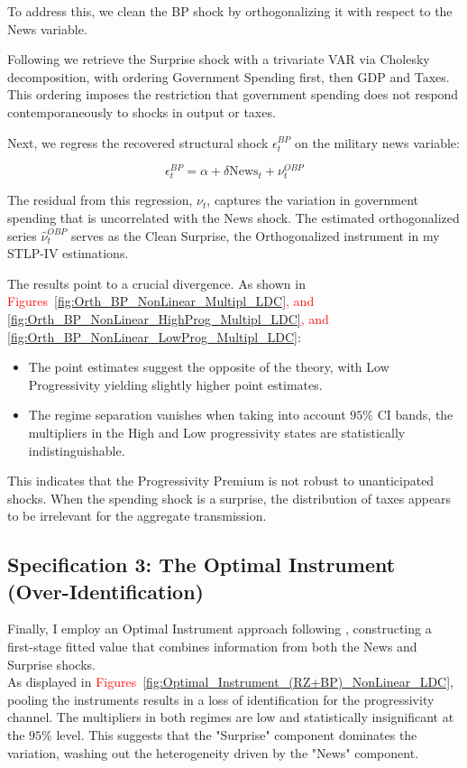\documentclass[12pt,letterpaper]{article}
\begin{document}
To address this, we clean the BP shock by orthogonalizing it with respect to the \cite{RameyZubairy2018} News variable. 

Following \cite{BP} we retrieve the Surprise shock with a trivariate VAR via Cholesky decomposition, with ordering Government Spending first, then GDP and Taxes. This ordering imposes the restriction that government spending does not respond contemporaneously to shocks in output or taxes.

Next, we regress the recovered structural shock $\epsilon^{BP}_t$ on the military news variable:

\begin{equation}
    \epsilon^{BP}_t = \alpha + \delta \text{News}_t + \nu^{OBP}_t
    \label{eq:orthogonalization}
\end{equation}

The residual from this regression, $\nu_t$, captures the variation in government spending that is uncorrelated with the News shock. The estimated orthogonalized series $\hat\nu^{OBP}_t$ serves as the Clean Surprise, the Orthogonalized \cite{BP} instrument in my STLP-IV estimations.

The results point to a crucial divergence. As shown in \textcolor{red}{Figures~\ref{fig:Orth_BP_NonLinear_Multipl_LDC}, and \ref{fig:Orth_BP_NonLinear_HighProg_Multipl_LDC}, and \ref{fig:Orth_BP_NonLinear_LowProg_Multipl_LDC}}:
\begin{itemize}
    \item The point estimates suggest the opposite of the theory, with Low Progressivity yielding slightly higher point estimates.
    \item The regime separation vanishes when taking into account $95\%$ CI bands, the multipliers in the High and Low progressivity states are statistically indistinguishable.
\end{itemize}
This indicates that the Progressivity Premium is not robust to unanticipated shocks. When the spending shock is a surprise, the distribution of taxes appears to be irrelevant for the aggregate transmission.

\subsection{Specification 3: The Optimal Instrument (Over-Identification)}
Finally, I employ an Optimal Instrument approach following \cite{MostlyHarmlessEconometrics}, constructing a first-stage fitted value that combines information from both the News and Surprise shocks.
\\
As displayed in \textcolor{red}{Figures~\ref{fig:Optimal_Instrument_(RZ+BP)_NonLinear_LDC}}, pooling the instruments results in a loss of identification for the progressivity channel. The multipliers in both regimes are low and statistically insignificant at the $95\%$ level. This suggests that the "Surprise" component dominates the variation, washing out the heterogeneity driven by the "News" component.
\end{document}
